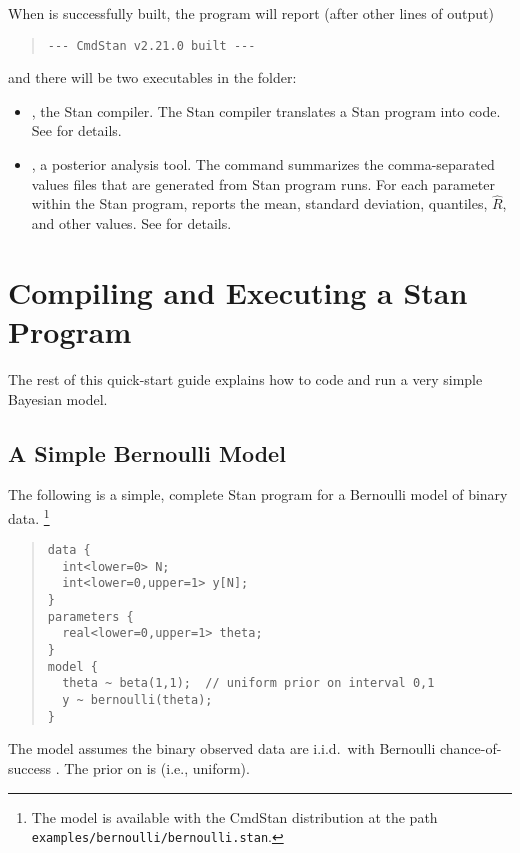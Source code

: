 %
When \CmdStan is successfully built, the  program will
report (after other lines of output)
%
\begin{quote}
  \begin{Verbatim}
--- CmdStan v2.21.0 built ---
  \end{Verbatim}
\end{quote}
%
and there will be two executables in the  folder:
%
\begin{itemize}
  \item {}, the Stan compiler. The Stan compiler
    translates a Stan program into \Cpp code. See 
    for details.
  \item {}, a posterior analysis tool. The 
    command summarizes the comma-separated values files that are
    generated from Stan program runs. For each parameter within the
    Stan program,  reports the mean, standard deviation,
    quantiles, $\hat{R}$, and other values. See  for
    details.
\end{itemize}

\section{Compiling and Executing a Stan Program}\label{compiling-model.section}

The rest of this quick-start guide explains how to code and run a very
simple Bayesian model.

\subsection{A Simple Bernoulli Model}

The following is a simple, complete Stan program for a Bernoulli model
of binary data.%
%
\footnote{The model is available with the CmdStan distribution at the path
  \nolinkurl{examples/bernoulli/bernoulli.stan}.  }
%
\begin{quote}
\begin{Verbatim}
data {
  int<lower=0> N;
  int<lower=0,upper=1> y[N];
}
parameters {
  real<lower=0,upper=1> theta;
}
model {
  theta ~ beta(1,1);  // uniform prior on interval 0,1
  y ~ bernoulli(theta);
}
\end{Verbatim}
\end{quote}
%
The model assumes the binary observed data 
are i.i.d.\ with Bernoulli chance-of-success .  The
prior on  is  (i.e., uniform).

